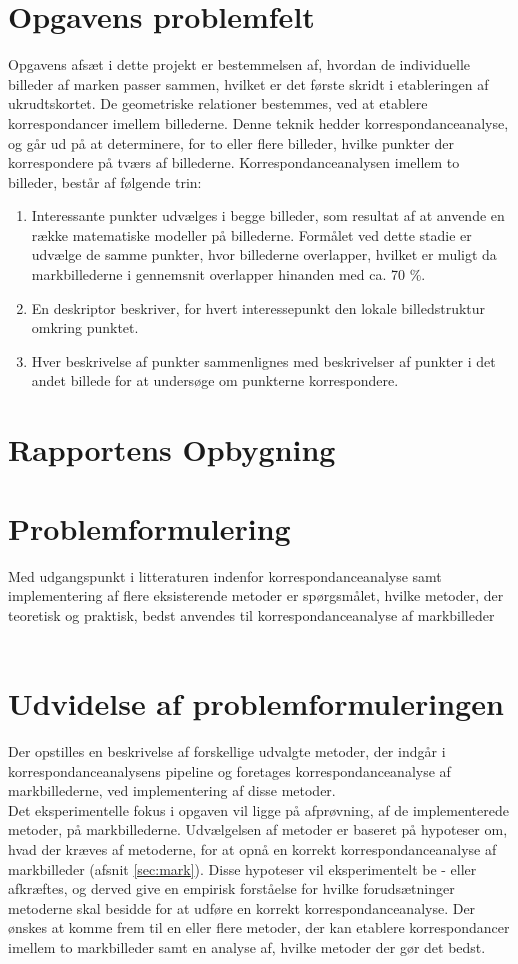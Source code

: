 \section{Opgavens problemfelt} \label{subsec:felt}
Opgavens afsæt i dette projekt er bestemmelsen af, hvordan de individuelle billeder af marken passer sammen, hvilket er det første skridt i etableringen af ukrudtskortet. De geometriske relationer bestemmes, ved at etablere korrespondancer imellem billederne. Denne teknik hedder korrespondanceanalyse, og går ud på at determinere, for to eller flere billeder, hvilke punkter der korrespondere på tværs af billederne. Korrespondanceanalysen imellem to billeder, består af følgende trin: 
\begin{enumerate}
\item{Interessante punkter udvælges i begge billeder, som resultat af at anvende en række matematiske modeller på billederne. Formålet ved dette stadie er udvælge de samme punkter, hvor billederne overlapper, hvilket er muligt da markbillederne i gennemsnit overlapper hinanden med ca. 70 \%.}
\item{En deskriptor beskriver, for hvert interessepunkt den lokale billedstruktur omkring punktet.}
\item{Hver beskrivelse af punkter sammenlignes med beskrivelser af punkter i det andet billede  for at undersøge om punkterne korrespondere.}
\end{enumerate}
\section{Rapportens Opbygning}
\section{Problemformulering} \label{subsec:form}
Med udgangspunkt i litteraturen indenfor
korrespondanceanalyse samt implementering af
flere eksisterende metoder er spørgsmålet, hvilke metoder, der teoretisk og praktisk, bedst anvendes til korrespondanceanalyse af markbilleder \\ \\
\section{Udvidelse af problemformuleringen}
Der opstilles en beskrivelse af forskellige udvalgte metoder, der indgår i korrespondanceanalysens pipeline og foretages korrespondanceanalyse af markbillederne, ved implementering af disse metoder. \\
Det eksperimentelle fokus i opgaven vil ligge på afprøvning, af de implementerede metoder, på markbillederne. Udvælgelsen af metoder er baseret på hypoteser om, hvad der kræves af metoderne, for at opnå en korrekt korrespondanceanalyse af markbilleder (afsnit \ref{sec:mark}). Disse hypoteser vil eksperimentelt be - eller afkræftes, og derved give en empirisk forståelse for hvilke forudsætninger metoderne skal besidde for at udføre en korrekt korrespondanceanalyse. Der ønskes at komme frem til en eller flere metoder, der kan etablere korrespondancer imellem to markbilleder samt en analyse af, hvilke metoder der gør det bedst.
